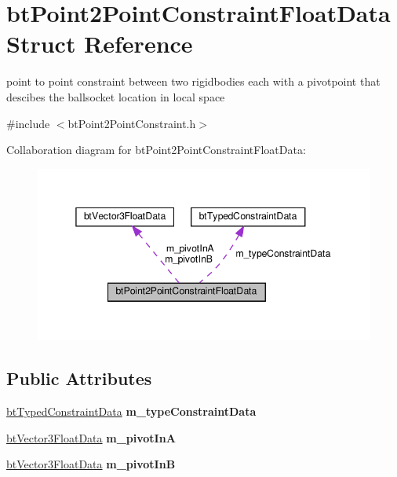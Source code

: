 \hypertarget{structbtPoint2PointConstraintFloatData}{}\section{bt\+Point2\+Point\+Constraint\+Float\+Data Struct Reference}
\label{structbtPoint2PointConstraintFloatData}


point to point constraint between two rigidbodies each with a pivotpoint that descibes the \textquotesingle{}ballsocket\textquotesingle{} location in local space  




{\ttfamily \#include $<$bt\+Point2\+Point\+Constraint.\+h$>$}



Collaboration diagram for bt\+Point2\+Point\+Constraint\+Float\+Data\+:
\nopagebreak
\begin{figure}[H]
\begin{center}
\leavevmode
\includegraphics[width=345pt]{structbtPoint2PointConstraintFloatData__coll__graph}
\end{center}
\end{figure}
\subsection*{Public Attributes}
\begin{DoxyCompactItemize}
\item 
\mbox{\label{structbtPoint2PointConstraintFloatData_a0da0bba346e0d1107c25d5b71ad69051}} 
\hyperlink{structbtTypedConstraintData}{bt\+Typed\+Constraint\+Data} {\bfseries m\+\_\+type\+Constraint\+Data}
\item 
\mbox{\label{structbtPoint2PointConstraintFloatData_ad9db453681a9e2135a9a73dde686e13a}} 
\hyperlink{structbtVector3FloatData}{bt\+Vector3\+Float\+Data} {\bfseries m\+\_\+pivot\+InA}
\item 
\mbox{\label{structbtPoint2PointConstraintFloatData_a32f38e4405e9fb7108ff0731c50b7476}} 
\hyperlink{structbtVector3FloatData}{bt\+Vector3\+Float\+Data} {\bfseries m\+\_\+pivot\+InB}
\end{DoxyCompactItemize}


